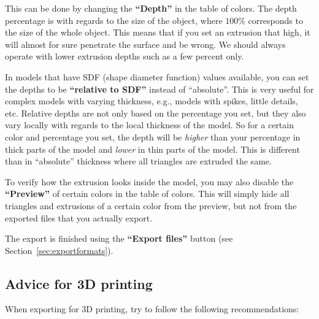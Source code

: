 This can be done by changing the \textbf{``Depth''} in the table of colors.
The depth percentage is with regards to the size of the object, where $100\%$ corresponds to the size of the whole object.
This means that if you set an extrusion that high, it will almost for sure penetrate the surface and be wrong.
We should always operate with lower extrusion depths such as a few percent only.

In models that have SDF (shape diameter function) values available, you can set the depths to be \textbf{``relative to SDF''} instead of ``absolute''.
This is very useful for complex models with varying thickness, e.g., models with spikes, little details, etc.
Relative depths are not only based on the percentage you set, but they also vary locally with regards to the local thickness of the model.
So for a certain color and percentage you set, the depth will be \emph{higher} than your percentage in thick parts of the model and \emph{lower} in thin parts of the model.
This is different than in ``absolute'' thickness where all triangles are extruded the same.

To verify how the extrusion looks inside the model, you may also disable the \textbf{``Preview''} of certain colors in the table of colors.
This will simply hide all triangles and extrusions of a certain color from the preview, but not from the exported files that you actually export.

The export is finished using the \textbf{``Export files''} button (see Section~\ref{sec:exportformats}).

\subsection{Advice for 3D printing}
When exporting for 3D printing, try to follow the following recommendations:

